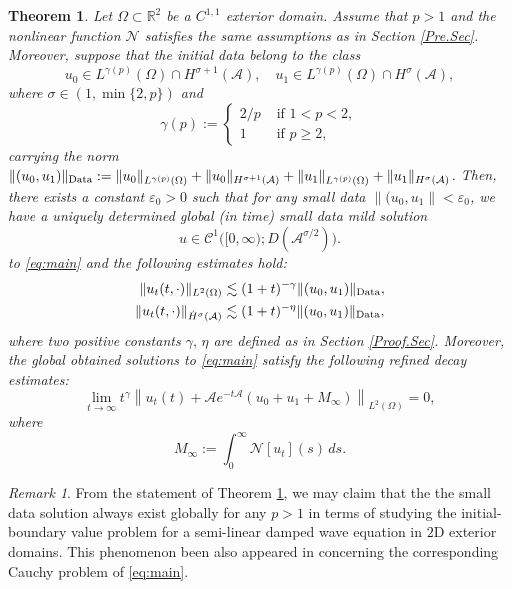 \documentclass[a4paper,11pt]{article} %
\newtheorem{theorem}{Theorem}[section]
\theoremstyle{remark}
\newtheorem{remark}{Remark}[section]
\theoremstyle{definition}
\numberwithin{equation}{section}
\begin{document}
\begin{theorem} \label{Main.Theorem}
Let \(\Omega\subset\mathbb R^2\) be a $C^{1,1}$ exterior domain. Assume that $p>1$ and the nonlinear function $\mathcal{N}$ satisfies the same assumptions as in Section \ref{Pre.Sec}. Moreover, suppose that the initial data belong to the class
\[
u_0\in L^{\gamma(p)}(\Omega)\cap H^{\sigma+1}(\mathcal{A}),
\quad
u_1\in L^{\gamma(p)}(\Omega)\cap H^\sigma(\mathcal{A}),
\]
where $\sigma\in (1,\min\{2,p\})$ and
\[
\gamma(p):=
\begin{cases}
2/p &\text{ if } 1<p<2,\\
1 &\text{ if } p\ge2,
\end{cases}
\]
carrying the norm $\|(u_0, u_1)\|_{\rm Data}:= \|u_0\|_{L^{\gamma(p)}(\Omega)}+\|u_0\|_{H^{\sigma+1}(\mathcal{A})}+\|u_1\|_{L^{\gamma(p)}(\Omega)}+\|u_1\|_{H^{\sigma}(\mathcal{A})}$. Then, there exists a constant $\varepsilon_0 > 0$ such that for any small data $\|(u_0, u_1\|< \varepsilon_0$, we have a uniquely determined global (in time) small data mild solution
\[
u\in \mathcal{C}^1\Big([0,\infty);D(\mathcal{A}^{\sigma/2})\Big).
\]
to \eqref{eq:main} and the following estimates hold:
        \begin{equation}\label{Decay.Es}
        \begin{split}
            \|u_t(t,\cdot)\|_{L^2(\Omega)} &\lesssim (1+t)^{-\gamma}\|(u_0, u_1)\|_{\rm Data}, \\
            \|u_t(t,\cdot)\|_{\dot{H}^\sigma(\mathcal{A})} &\lesssim (1+t)^{-\eta}\|(u_0, u_1)\|_{\rm Data},
        \end{split}
        \end{equation}
where two positive constants $\gamma,\,\eta$ are defined as in Section \ref{Proof.Sec}. Moreover, the global obtained solutions to \eqref{eq:main} satisfy the following refined decay estimates:
\begin{equation}
\label{eq:ut-diffusion-limit}
\lim_{t\to\infty}
t^\gamma
\left\|
u_t(t)+\mathcal{A}e^{-t\mathcal{A}}(u_0+u_1+M_\infty)
\right\|_{L^2(\Omega)}
=
0,
\end{equation}
where
$$M_\infty
:=
\int_0^\infty \mathcal{N}[u_t](s)\,ds. $$
\end{theorem}

\begin{remark}
From the statement of Theorem \ref{Main.Theorem}, we may claim that the the small data solution always exist globally for any $p>1$ in terms of studying the initial-boundary value problem for a semi-linear damped wave equation in $2$D exterior domains. This phenomenon been also appeared in \cite{DuongDao} concerning the corresponding Cauchy problem of \eqref{eq:main}.
\end{remark}
\end{document}
